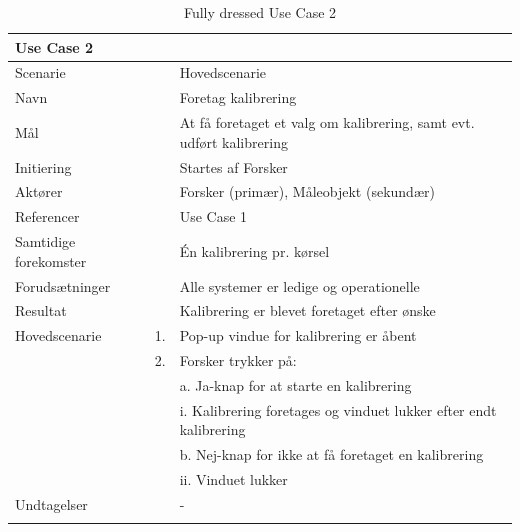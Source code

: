 \begin{longtabu} to  %
	{\large \textbf{Use Case 2}} && \\
	\toprule
	Scenarie && Hovedscenarie\\
	Navn && Foretag kalibrering\\
	Mål && At få foretaget et valg om kalibrering, samt evt. udført kalibrering\\
	Initiering && Startes af Forsker\\
	Aktører && Forsker (primær), Måleobjekt (sekundær)\\
	Referencer && Use Case 1\\
	Samtidige forekomster  && Én kalibrering pr. kørsel \\
	Forudsætninger && Alle systemer er ledige og operationelle\\ 
	Resultat && Kalibrering er blevet foretaget efter ønske \\ \midrule
	Hovedscenarie &    1. &		Pop-up vindue for kalibrering er åbent\\				 	
	&    2. & Forsker trykker på:\\ 
	& &	a. Ja-knap for at starte en kalibrering\\[-1ex]
	& &		 i. Kalibrering foretages og vinduet lukker efter endt kalibrering\\[-1ex]
	& &  b. Nej-knap for ikke at få foretaget en kalibrering\\[-1ex]
	& &   ii. Vinduet lukker\\[-1ex]	
	Undtagelser && -  \\ \bottomrule
	
	\caption{Fully dressed Use Case 2}
	\label{UC2}
\end{longtabu}

